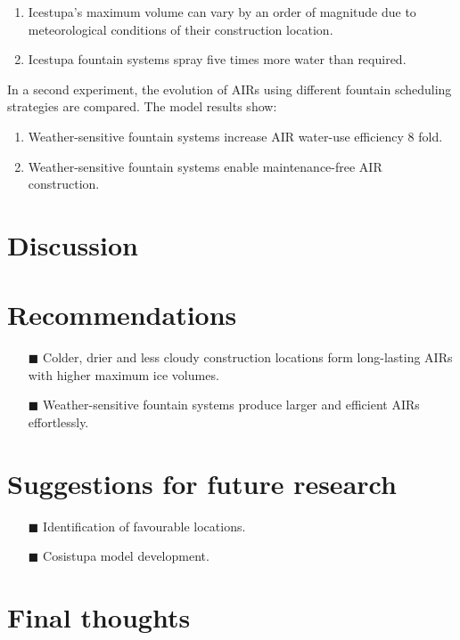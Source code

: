 \begin{enumerate} 

\item Icestupa's maximum volume can vary by an order of magnitude due to meteorological
  conditions of their construction location. 

\item Icestupa fountain systems spray five times more water than required.

\end{enumerate}

In a second experiment, the evolution of AIRs using different fountain scheduling strategies are compared. The
model results show: 

\begin{enumerate} 

\item Weather-sensitive fountain systems increase AIR water-use efficiency 8 fold.

\item Weather-sensitive fountain systems enable maintenance-free AIR construction.

\end{enumerate}

\section{Discussion}

\section{Recommendations}

\begin{itemize} 

\item[\tiny{$\blacksquare$}] Colder, drier and less cloudy construction locations form long-lasting AIRs with
  higher maximum ice volumes. 

\item[\tiny{$\blacksquare$}] Weather-sensitive fountain systems produce larger and efficient AIRs effortlessly. 

\end{itemize}

\section{Suggestions for future research}

\begin{itemize} 

\item[\tiny{$\blacksquare$}] Identification of favourable locations.

\item[\tiny{$\blacksquare$}] Cosistupa model development.


\end{itemize}

\section{Final thoughts}

